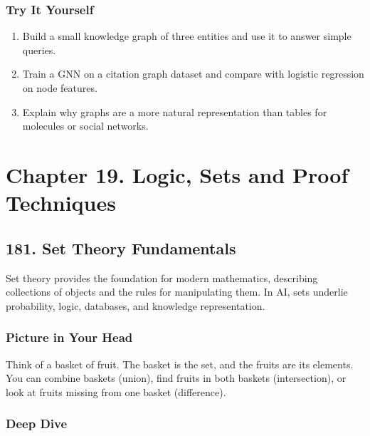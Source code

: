 \documentclass[
  letterpaper,
  DIV=11,
  numbers=noendperiod]{scrreprt}
\providecommand{\tightlist}{%
  \setlength{\itemsep}{0pt}\setlength{\parskip}{0pt}}
\begin{document}
\subsubsection{Try It Yourself}\label{try-it-yourself-179}

\begin{enumerate}
\def\labelenumi{\arabic{enumi}.}
\tightlist
\item
  Build a small knowledge graph of three entities and use it to answer
  simple queries.
\item
  Train a GNN on a citation graph dataset and compare with logistic
  regression on node features.
\item
  Explain why graphs are a more natural representation than tables for
  molecules or social networks.
\end{enumerate}

\section{Chapter 19. Logic, Sets and Proof
Techniques}\label{chapter-19.-logic-sets-and-proof-techniques}

\subsection{181. Set Theory Fundamentals}\label{set-theory-fundamentals}

Set theory provides the foundation for modern mathematics, describing
collections of objects and the rules for manipulating them. In AI, sets
underlie probability, logic, databases, and knowledge representation.

\subsubsection{Picture in Your Head}\label{picture-in-your-head-180}

Think of a basket of fruit. The basket is the set, and the fruits are
its elements. You can combine baskets (union), find fruits in both
baskets (intersection), or look at fruits missing from one basket
(difference).

\subsubsection{Deep Dive}\label{deep-dive-180}
\end{document}
